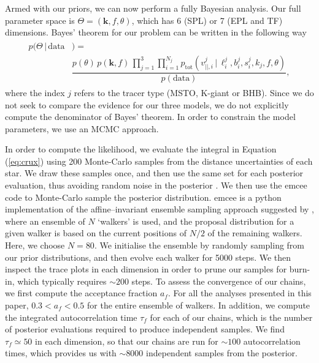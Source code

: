 \documentclass[useAMS,twocolumn,usenatbib]{mn2e}
\begin{document}
Armed with our priors, we can now perform a fully Bayesian analysis. 
Our full parameter space is $\Theta =(\boldsymbol{k},f,\theta)$, which has 6 (SPL) or 7 (EPL and TF) dimensions. 
Bayes' theorem for our problem can be written in the following way
%
\begin{gather}
\begin{align}
p(\Theta \,| \,\mathrm{data}{}&) =  \nonumber \\
                    {}& \dfrac{p(\theta)\,p(\boldsymbol{k},f)\,\prod\limits_{j=1}^3
                    \prod\limits_{i=1}^{N_j}p_\mathrm{tot}(v_{||,i}^j \,|\, \ell_i^j,b_i^j,s_i^j,k_j,f,\theta)}{p(\mathrm{data})},
\end{align}
\label{eq:bayes}
\end{gather}
%
where the index $j$ refers to the tracer type (MSTO, K-giant or BHB). 
Since we do not seek to compare the evidence for our three models, we do not explicitly compute the denominator of Bayes' theorem. 
In order to constrain the model parameters, we use an MCMC approach.

In order to compute the likelihood, we evaluate the integral in Equation (\ref{eq:crux}) using 200 Monte-Carlo samples from the distance uncertainties of each star. 
We draw these samples once, and then use the same set for each posterior evaluation, thus avoiding random noise in the posterior \citep{Mc13}.
We then use the {\sc emcee} code \citep{emcee} to Monte-Carlo sample the posterior distribution. 
{\sc emcee} is a {\sc python} implementation of the affine--invariant ensemble sampling approach suggested by \citet{Go10}, where an ensemble of $N$ `walkers' is used, and the proposal distribution for a given walker is based on the current positions of $N/2$ of the remaining walkers. 
Here, we choose $N=80$.
We initialise the ensemble by randomly sampling from our prior distributions, and then evolve each walker for 5000 steps. 
We then inspect the trace plots in each dimension in order to prune our samples for burn-in, which typically requires $\sim 200$ steps. 
To assess the convergence of our chains, we first compute the acceptance fraction $a_f$.
For all the analyses presented in this paper, $0.3 < a_f < 0.5$ for the entire ensemble of walkers.
In addition, we compute the integrated autocorrelation time $\tau_f$ for each of our chains, which is the number of posterior evaluations required to produce independent samples.
We find $\tau_f \simeq 50$ in each dimension, so that our chains are run for $\sim 100$ autocorrelation times, which provides us with $\sim 8000$ independent samples from the posterior.
\end{document}

